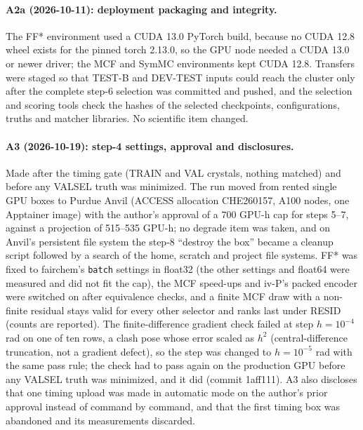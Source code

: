 \paragraph{A2a (2026-10-11): deployment packaging and integrity.} The FF*
environment used a CUDA 13.0 PyTorch build, because no CUDA 12.8 wheel exists for
the pinned torch 2.13.0, so the GPU node needed a CUDA 13.0 or newer driver; the
MCF and SymMC environments kept CUDA 12.8. Transfers were staged so that TEST-B and
DEV-TEST inputs could reach the cluster only after the complete step-6 selection
was committed and pushed, and the selection and scoring tools check the hashes of
the selected checkpoints, configurations, truths and matcher libraries. No
scientific item changed.

\paragraph{A3 (2026-10-19): step-4 settings, approval and disclosures.} Made after
the timing gate (TRAIN and VAL crystals, nothing matched) and before any VALSEL
truth was minimized. The run moved from rented single GPU boxes to Purdue Anvil
(ACCESS allocation CHE260157, A100 nodes, one Apptainer image) with the author's
approval of a 700 GPU-h cap for steps 5--7, against a projection of 515--535 GPU-h;
no degrade item was taken, and on Anvil's persistent file system the step-8 ``destroy
the box'' became a cleanup script followed by a search of the home, scratch and
project file systems. FF* was fixed to fairchem's \texttt{batch} settings in
float32 (the other settings and float64 were measured and did not fit the cap),
the MCF speed-ups and iv-P's packed encoder were switched on after equivalence
checks, and a finite MCF draw with a non-finite residual stays valid for every
other selector and ranks last under RESID (counts are reported). The
finite-difference gradient check failed at step $h=10^{-4}$ rad on one of ten rows,
a clash pose whose error scaled as $h^2$ (central-difference truncation, not a
gradient defect), so the step was changed to $h=10^{-5}$ rad with the same pass
rule; the check had to pass again on the production GPU before any VALSEL truth was
minimized, and it did (commit 1aff111). A3 also discloses that one timing upload
was made in automatic mode on the author's prior approval instead of command by
command, and that the first timing box was abandoned and its measurements
discarded.

